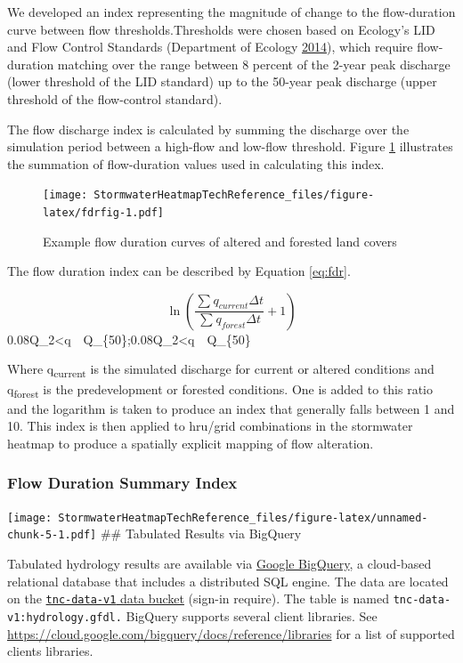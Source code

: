 \documentclass[
]{report}
\begin{document}
We developed an index representing the magnitude of change to the flow-duration curve between flow thresholds.Thresholds were chosen based on Ecology's LID and Flow Control Standards (Department of Ecology \protect\hyperlink{ref-DepartmentofEcology2014}{2014}), which require flow-duration matching over the range between 8 percent of the 2-year peak discharge (lower threshold of the LID standard) up to the 50-year peak discharge (upper threshold of the flow-control standard).

The flow discharge index is calculated by summing the discharge over the simulation period between a high-flow and low-flow threshold. Figure \ref{fig:fdrfig} illustrates the summation of flow-duration values used in calculating this index.

\begin{figure}
\centering
\texttt{[image: StormwaterHeatmapTechReference\_files/figure-latex/fdrfig-1.pdf]}
\caption{\label{fig:fdrfig}Example flow duration curves of altered and forested land covers}
\end{figure}

The flow duration index can be described by Equation \eqref{eq:fdr}.

\begin{equation}
  \ln\left(\frac{\sum_{ }^{ }q_{current}\Delta t}{\sum_{ }^{ }q_{forest}\Delta t}+1\right)
  \label{eq:fdr}
\end{equation}0.08Q\_2\textless q~\le~Q\_\{50\};0.08Q\_2\textless q~\le~Q\_\{50\}

Where q\textsubscript{current} is the simulated discharge for current or altered conditions and q\textsubscript{forest} is the predevelopment or forested conditions. One is added to this ratio and the logarithm is taken to produce an index that generally falls between 1 and 10. This index is then applied to hru/grid combinations in the stormwater heatmap to produce a spatially explicit mapping of flow alteration.

\hypertarget{flow-duration-summary-index}{%
\subsubsection{Flow Duration Summary Index}\label{flow-duration-summary-index}}

\texttt{[image: StormwaterHeatmapTechReference\_files/figure-latex/unnamed-chunk-5-1.pdf]}
\#\# Tabulated Results via BigQuery

Tabulated hydrology results are available via \href{https://cloud.google.com/bigquery}{Google BigQuery}, a cloud-based relational database that includes a distributed SQL engine. The data are located on the \href{https://console.cloud.google.com/bigquery?project=tnc-data-v1}{\texttt{tnc-data-v1} data bucket} (sign-in require). The table is named \texttt{tnc-data-v1:hydrology.gfdl.} BigQuery supports several client libraries. See \url{https://cloud.google.com/bigquery/docs/reference/libraries} for a list of supported clients libraries.
\end{document}
